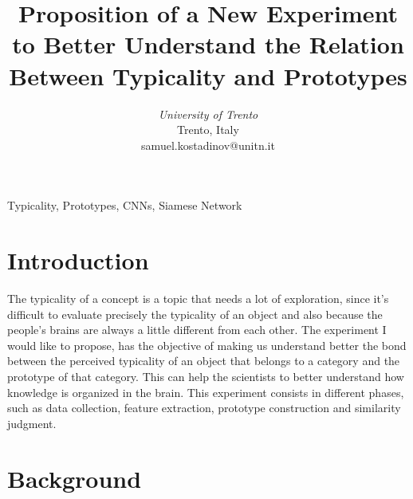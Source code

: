 \documentclass[conference]{IEEEtran}
\begin{document}
\title{Proposition of a New Experiment to Better Understand the Relation Between Typicality and Prototypes}


\author{
\textit{University of Trento}\\
Trento, Italy \\
samuel.kostadinov@unitn.it}


\maketitle


\begin{abstract}
	
	\lipsum[1]
	
\end{abstract}

\begin{IEEEkeywords}
Typicality, Prototypes, CNNs, Siamese Network
\end{IEEEkeywords}


\section{Introduction}
	
	The typicality of a concept is a topic that needs a lot of exploration, since it's difficult to evaluate precisely the typicality of an object 
	and also because the people's brains are always a little different from each other. The experiment I would like to propose, has the objective of 
	making us understand better the bond between the perceived typicality of an object that belongs to a category and the prototype of that category.
	This can help the scientists to better understand how knowledge is organized in the brain. This experiment consists in different phases, such as
	data collection, feature extraction, prototype construction and similarity judgment.


\section{Background}
\end{document}
